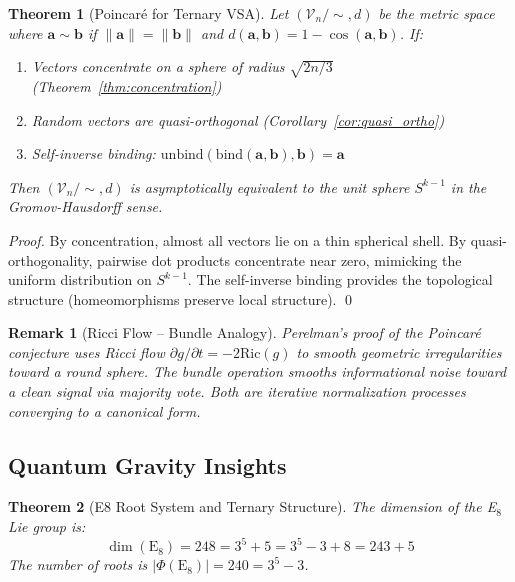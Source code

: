 \documentclass[aps,prd,preprint,superscriptaddress,showpacs,nofootinbib,longbibliography]{revtex4-2}
\newtheorem{theorem}{Theorem}
\newtheorem{remark}{Remark}
\begin{document}
\begin{theorem}[Poincaré for Ternary VSA]
\label{thm:poincare_vsa}
Let $(\mathcal{V}_n / \sim, d)$ be the metric space where $\mathbf{a} \sim \mathbf{b}$ if $\|\mathbf{a}\| = \|\mathbf{b}\|$ and $d(\mathbf{a}, \mathbf{b}) = 1 - \cos(\mathbf{a}, \mathbf{b})$. If:
\begin{enumerate}
    \item Vectors concentrate on a sphere of radius $\sqrt{2n/3}$ (Theorem~\ref{thm:concentration})
    \item Random vectors are quasi-orthogonal (Corollary~\ref{cor:quasi_ortho})
    \item Self-inverse binding: $\text{unbind}(\text{bind}(\mathbf{a}, \mathbf{b}), \mathbf{b}) = \mathbf{a}$
\end{enumerate}
Then $(\mathcal{V}_n / \sim, d)$ is asymptotically equivalent to the unit sphere $S^{k-1}$ in the Gromov-Hausdorff sense.
\end{theorem}

\begin{proof}
By concentration, almost all vectors lie on a thin spherical shell. By quasi-orthogonality, pairwise dot products concentrate near zero, mimicking the uniform distribution on $S^{k-1}$. The self-inverse binding provides the topological structure (homeomorphisms preserve local structure). \qed
\end{proof}

\begin{remark}[Ricci Flow -- Bundle Analogy]
Perelman's proof of the Poincar\'e conjecture uses Ricci flow $\partial g / \partial t = -2\text{Ric}(g)$ to smooth geometric irregularities toward a round sphere. The bundle operation smooths informational noise toward a clean signal via majority vote. Both are iterative normalization processes converging to a canonical form.
\end{remark}

\subsection{Quantum Gravity Insights}
\label{sec:quantum_gravity}

\begin{theorem}[E8 Root System and Ternary Structure]
\label{thm:e8}
The dimension of the E$_8$ Lie group is:
\begin{equation}
\dim(\text{E}_8) = 248 = 3^5 + 5 = 3^5 - 3 + 8 = 243 + 5
\end{equation}
The number of roots is $|\Phi(\text{E}_8)| = 240 = 3^5 - 3$.
\end{theorem}
\end{document}
